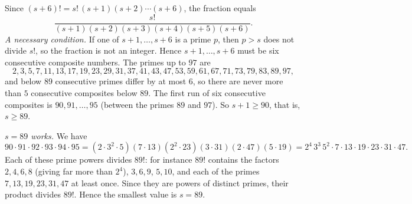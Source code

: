 Since $(s+6)!=s!\,(s+1)(s+2)\cdots(s+6)$, the fraction equals
\[
\dfrac{s!}{(s+1)(s+2)(s+3)(s+4)(s+5)(s+6)} .
\]
\emph{A necessary condition.} If one of $s+1,\dots,s+6$ is a prime $p$, then $p>s$ does not divide $s!$, so the fraction is not an integer. Hence $s+1,\dots,s+6$ must be six consecutive composite numbers. The primes up to $97$ are
\[
2,3,5,7,11,13,17,19,23,29,31,37,41,43,47,53,59,61,67,71,73,79,83,89,97,
\]
and below $89$ consecutive primes differ by at most $6$, so there are never more than $5$ consecutive composites below $89$. The first run of six consecutive composites is $90,91,\dots,95$ (between the primes $89$ and $97$). So $s+1\ge90$, that is, $s\ge89$.

\emph{$s=89$ works.} We have
\[
90\cdot91\cdot92\cdot93\cdot94\cdot95=(2\cdot3^2\cdot5)(7\cdot13)(2^2\cdot23)(3\cdot31)(2\cdot47)(5\cdot19)=2^4\,3^3\,5^2\cdot7\cdot13\cdot19\cdot23\cdot31\cdot47 .
\]
Each of these prime powers divides $89!$: for instance $89!$ contains the factors $2,4,6,8$ (giving far more than $2^4$), $3,6,9$, $5,10$, and each of the primes $7,13,19,23,31,47$ at least once. Since they are powers of distinct primes, their product divides $89!$. Hence the smallest value is $s=\boxed{89}$.
